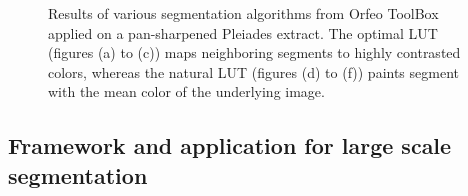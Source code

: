 \documentclass{josis}
\begin{document}
\begin{figure}[!htb]
\quad
{}
\quad
{}
\caption{Results of various segmentation algorithms from Orfeo ToolBox
  applied on a pan-sharpened Pleiades extract. The optimal LUT (figures
  (a) to (c)) maps
  neighboring segments to highly contrasted colors, whereas the
  natural LUT (figures
  (d) to (f)) paints segment with the mean color of the underlying image.}\label{fig:segalgs}
\end{figure}


\subsection{Framework and application for large scale segmentation}
\end{document}
